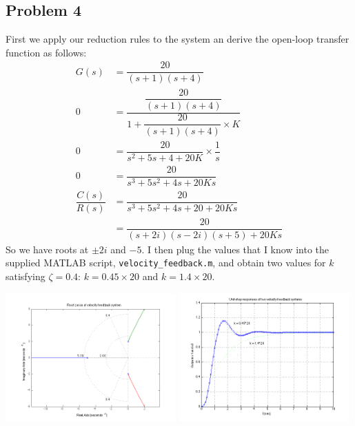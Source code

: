 \documentclass[letterpaper,10pt]{article}
\begin{document}
\subsection*{Problem 4}
First we apply our reduction rules to the system an derive the open-loop transfer function as follows:
\begin{align*}
	G(s) &= \dfrac{20}{(s+1)(s+4)} \\
	0 &= \dfrac{\dfrac{20}{(s+1)(s+4)}}{1+\dfrac{20}{(s+1)(s+4)}\times K} \\
	0 &= \dfrac{20}{s^{2}+5s+4+20K} \times \dfrac{1}{s} \\
	0 &= \dfrac{20}{s^{3}+5s^{2}+4s+20Ks} \\
	\dfrac{C(s)}{R(s)} &= \dfrac{20}{s^{3}+5s^{2}+4s+20+20Ks} \\
	&= \dfrac{20}{(s+2i)(s-2i)(s+5)+20Ks} 
\end{align*}
So we have roots at $\pm 2i$ and $-5$.  I then plug the values that I know into the supplied MATLAB script, \texttt{velocity\_feedback.m}, and obtain two values for $k$ satisfying $\zeta = 0.4$: $k = 0.45\times20$ and $k = 1.4\times20$.
\begin{center}
	\includegraphics[width=0.49\textwidth]{homework04-7-4a.png}
	\includegraphics[width=0.49\textwidth]{homework04-7-4b.png}
\end{center}
\end{document}
